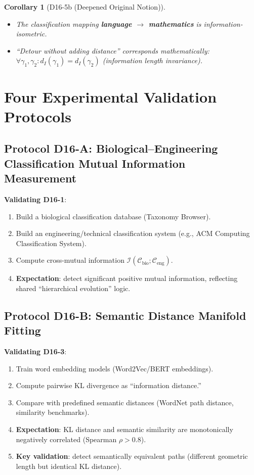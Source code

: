 \documentclass[12pt, a4paper]{article}
\newtheorem{corollary}{Corollary}[section]
\newcommand{\calI}{\mathcal{I}}
\begin{document}
\begin{corollary}[D16-5b (Deepened Original Notion)]\label{corr:D16-5b}
\begin{itemize}
    \item The classification mapping \textbf{language $\to$ mathematics} is information-isometric.
    \item ``Detour without adding distance'' corresponds mathematically: $\forall \gamma_1, \gamma_2: d_I(\gamma_1) = d_I(\gamma_2)$ (information length invariance).
\end{itemize}
\end{corollary}

\section{Four Experimental Validation Protocols}

\subsection{Protocol D16-A: Biological--Engineering Classification Mutual Information Measurement}

\textbf{Validating D16-1}:
\begin{enumerate}
    \item Build a biological classification database (Taxonomy Browser).
    \item Build an engineering/technical classification system (e.g., ACM Computing Classification System).
    \item Compute cross-mutual information $\calI(\mathcal{C}_{\mathrm{bio}}; \mathcal{C}_{\mathrm{eng}})$.
    \item \textbf{Expectation}: detect significant positive mutual information, reflecting shared ``hierarchical evolution'' logic.
\end{enumerate}

\subsection{Protocol D16-B: Semantic Distance Manifold Fitting}

\textbf{Validating D16-3}:
\begin{enumerate}
    \item Train word embedding models (Word2Vec/BERT embeddings).
    \item Compute pairwise KL divergence as ``information distance.''
    \item Compare with predefined semantic distances (WordNet path distance, similarity benchmarks).
    \item \textbf{Expectation}: KL distance and semantic similarity are monotonically negatively correlated (Spearman $\rho > 0.8$).
    \item \textbf{Key validation}: detect semantically equivalent paths (different geometric length but identical KL distance).
\end{enumerate}
\end{document}
